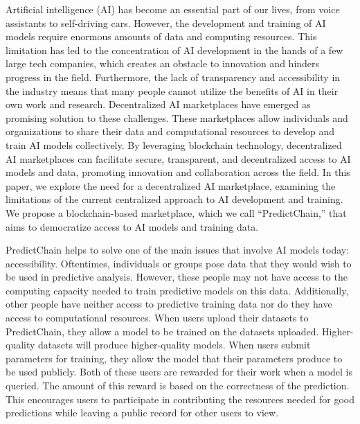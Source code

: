 \documentclass{ledger}
\begin{document}
Artificial intelligence (AI) has become an essential part of our lives, from voice assistants to self-driving cars. However, the development and training of AI models require enormous amounts of data and computing resources. This limitation has led to the concentration of AI development in the hands of a few large tech companies, which creates an obstacle to innovation and hinders progress in the field. Furthermore, the lack of transparency and accessibility in the industry means that many people cannot utilize the benefits of AI in their own work and research.
%
Decentralized AI marketplaces have emerged as promising solution to these challenges. These marketplaces allow individuals and organizations to share their data and computational resources to develop and train AI models collectively. By leveraging blockchain technology, decentralized AI marketplaces can facilitate secure, transparent, and decentralized access to AI models and data, promoting innovation and collaboration across the field.
%
In this paper, we explore the need for a decentralized AI marketplace, examining the limitations of the current centralized approach to AI development and training. We propose a blockchain-based marketplace, which we call ``PredictChain,'' that aims to democratize access to AI models and training data.

PredictChain helps to solve one of the main issues that involve AI models today: accessibility.
Oftentimes, individuals or groups pose data that they would wish to be used in predictive analysis.
However, these people may not have access to the computing capacity needed to train predictive models on this data.  Additionally, other people have neither access to predictive training data nor do they have access to computational resources.
%
When users upload their datasets to PredictChain, they allow a model to be trained on the datasets uploaded.  Higher-quality datasets will produce higher-quality models.  When users submit parameters for training, they allow the model that their parameters produce to be used publicly.  Both of these users are rewarded for their work when a model is queried.  The amount of this reward is based on the correctness of the prediction.  This encourages users to participate in contributing the resources needed for good predictions while leaving a public record for other users to view.
\end{document}
